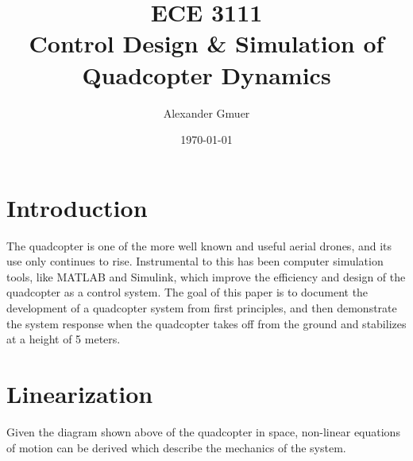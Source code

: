 \documentclass[12pt]{article}
\title{{\bf{ECE 3111}} \\ Control Design \& Simulation of Quadcopter Dynamics}
\author{Alexander Gmuer}
\date{\today}
\begin{document}
\maketitle

\section*{Introduction}

The quadcopter is one of the more well known and useful aerial drones, and its use only continues 
to rise. Instrumental to this has been computer simulation tools, like MATLAB and Simulink, which improve the 
efficiency and design of the quadcopter as a control system. The goal of this paper is to document the development 
of a quadcopter system from first principles, and then demonstrate the system response when the quadcopter takes off from
the ground and stabilizes at a height of 5 meters.  


\section*{Linearization}

Given the diagram shown above of the quadcopter in space, non-linear equations of motion can be derived
which describe the mechanics of the system. 
\end{document}
